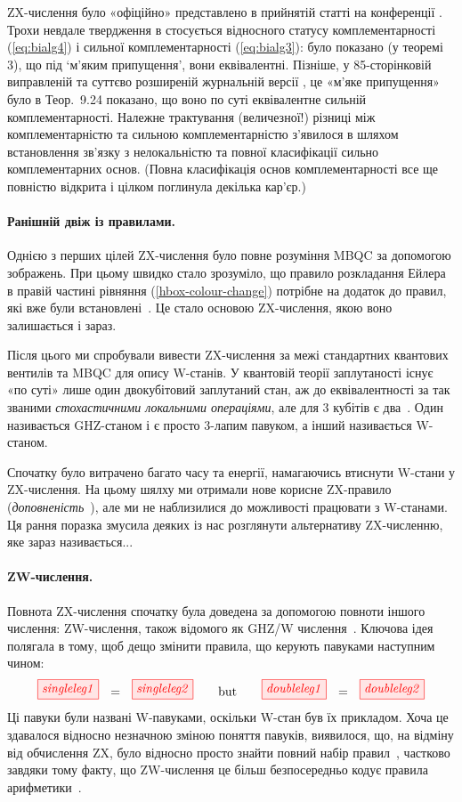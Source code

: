 \documentclass[11pt]{article}
\theoremstyle{definition}
\begin{document}
{%
ZX-числення було «офіційно» представлено в прийнятій статті на конференції \cite[ICALP, 2008]{CD1}. Трохи невдале твердження в \cite{CD1} стосується відносного статусу комплементарності (\ref{eq:bialg4}) і сильної комплементарності (\ref{eq:bialg3}): було показано (у теоремі 3), що під `м’яким припущення', вони еквівалентні. Пізніше, у 85-сторінковій виправленій та суттєво розширеній журнальній версії \cite[NJP, 2011]{CD2}, це «м’яке припущення» було в Теор.~9.24 показано, що воно по суті еквівалентне сильній комплементарності. Належне трактування (величезної!) різниці між комплементарністю та сильною комплементарністю з’явилося в \cite{CDKZ} шляхом встановлення зв’язку з нелокальністю та повної класифікації сильно комплементарних основ. (Повна класифікація основ комплементарності все ще повністю відкрита і цілком поглинула декілька кар'єр.)

\paragraph{Ранішній двіж із правилами.} Однією з перших цілей ZX-числення було повне розуміння MBQC за допомогою зображень. При цьому швидко стало зрозуміло, що правило розкладання Ейлера в правій частині рівняння (\ref{hbox-colour-change}) потрібне на додаток до правил, які вже були встановлені~\cite{duncan2009graph}.
Це стало основою ZX-числення, якою воно залишається і зараз.

Після цього ми спробували вивести ZX-числення за межі стандартних квантових вентилів та MBQC для опису W-станів. У квантовій теорії заплутаності існує «по суті» лише один двокубітовий заплутаний стан, аж до еквівалентності за так званими \textit{стохастичними локальними операціями}, але для 3 кубітів є два~\cite{DurVC}. Один називається GHZ-станом і є просто 3-лапим павуком, а інший називається W-станом.

Спочатку було витрачено багато часу та енергії, намагаючись втиснути W-стани у ZX-числення. На цьому шялху ми отримали нове корисне ZX-правило (\textit{доповненість}~\cite{CEGHZW}), але ми не наблизилися до можливості працювати з W-станами.
Ця рання поразка змусила деяких із нас розглянути альтернативу ZX-численню, яке зараз називається...

\paragraph{ZW-числення.} Повнота ZX-числення спочатку була доведена за допомогою повноти іншого числення: ZW-числення, також відомого як GHZ/W числення~\cite{CK}. Ключова ідея полягала в тому, щоб дещо змінити правила, що керують павуками
наступним чином:
\[
\tikzfig{singleleg1}\ \ =\ \ \tikzfig{singleleg2} 
\qquad\mbox{but}\qquad
\tikzfig{doubleleg1}\ \ =\ \ \tikzfig{doubleleg2}
\]
Ці павуки були названі W-павуками, оскільки W-стан був їх прикладом. Хоча це здавалося відносно незначною зміною поняття павуків, виявилося, що, на відміну від обчислення ZX, було відносно просто знайти повний набір правил~\cite{Amar}, частково завдяки тому факту, що ZW-числення це більш безпосередньо кодує правила арифметики~\cite{CKMR}.

}
\end{document}
